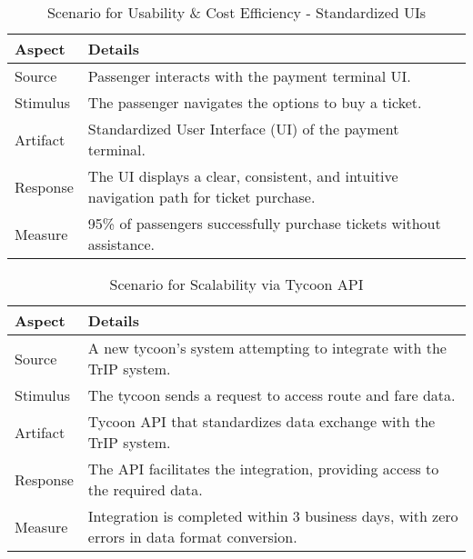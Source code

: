 \begin{table}[H]
    \centering
    \begin{tabularx}{\textwidth}{@{} lX @{}}
    \toprule
    \textbf{Aspect} & \textbf{Details} \\
    \midrule
    Source & Passenger interacts with the payment terminal UI. \\
    Stimulus & The passenger navigates the options to buy a ticket. \\
    Artifact & Standardized User Interface (UI) of the payment terminal. \\
    Response & The UI displays a clear, consistent, and intuitive navigation path for ticket purchase. \\
    Measure & 95\% of passengers successfully purchase tickets without assistance. \\
    \bottomrule
    \end{tabularx}
    \caption{Scenario for Usability \& Cost Efficiency - Standardized UIs}
    \label{table:usability_enhancement}
\end{table}


\begin{table}[H]
    \centering
    \begin{tabularx}{\textwidth}{@{} lX @{}}
    \toprule
    \textbf{Aspect} & \textbf{Details} \\
    \midrule
    Source & A new tycoon's system attempting to integrate with the TrIP system. \\
    Stimulus & The tycoon sends a request to access route and fare data. \\
    Artifact & Tycoon API that standardizes data exchange with the TrIP system. \\
    Response & The API facilitates the integration, providing access to the required data. \\
    Measure & Integration is completed within 3 business days, with zero errors in data format conversion. \\
    \bottomrule
    \end{tabularx}
    \caption{Scenario for Scalability via Tycoon API}
    \label{table:scalability_tycoon_api}
\end{table}

